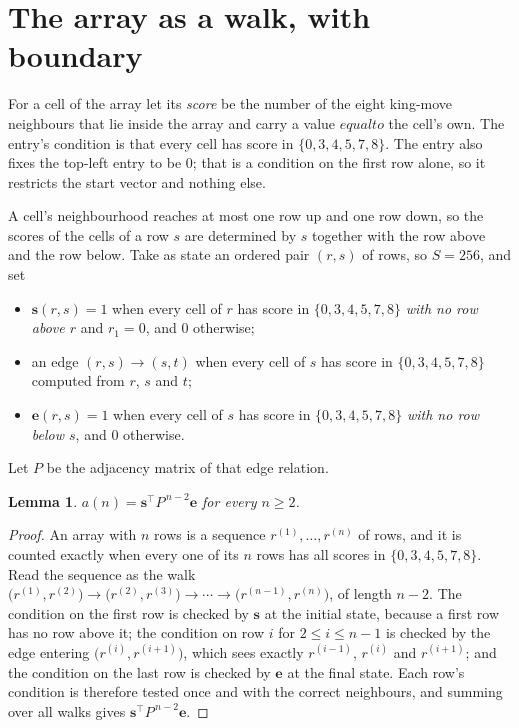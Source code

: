 \documentclass[11pt,a4paper]{article}
\theoremstyle{plain}
\newtheorem{lemma}[theorem]{Lemma}
\theoremstyle{definition}
\begin{document}
\section{The array as a walk, with boundary}

For a cell of the array let its \emph{score} be the number of the eight king-move neighbours that lie inside
the array and carry a value $equal to$ the cell's own. The entry's condition is that every cell
has score in $\{0,3,4,5,7,8\}$. The entry also fixes the top-left entry to be $0$; that is a condition on the first row alone, so it restricts the start vector and nothing else.

A cell's neighbourhood reaches at most one row up and one row down, so the scores of the
cells of a row $s$ are determined by $s$ together with the row above and the row below.
Take as state an ordered pair $(r,s)$ of rows, so $S=256$, and set
\begin{itemize}
\item $\mathbf{s}(r,s)=1$ when every cell of $r$ has score in $\{0,3,4,5,7,8\}$ \emph{with no row
above $r$} and $r_1=0$, and $0$ otherwise;
\item an edge $(r,s)\to(s,t)$ when every cell of $s$ has score in $\{0,3,4,5,7,8\}$ computed from
$r$, $s$ and $t$;
\item $\mathbf{e}(r,s)=1$ when every cell of $s$ has score in $\{0,3,4,5,7,8\}$ \emph{with no row
below $s$}, and $0$ otherwise.
\end{itemize}
Let $P$ be the adjacency matrix of that edge relation.

\begin{lemma}\label{lem:walk}
$a(n)=\mathbf{s}^{\!\top}P^{\,n-2}\mathbf{e}$ for every $n\ge2$.
\end{lemma}

\begin{proof}
An array with $n$ rows is a sequence $r^{(1)},\dots,r^{(n)}$ of rows, and it is counted
exactly when every one of its $n$ rows has all scores in $\{0,3,4,5,7,8\}$. Read the sequence as the
walk $\bigl(r^{(1)},r^{(2)}\bigr)\to\bigl(r^{(2)},r^{(3)}\bigr)\to\cdots\to
\bigl(r^{(n-1)},r^{(n)}\bigr)$, of length $n-2$. The condition on the first row is
checked by $\mathbf{s}$ at the initial state, because a first row has no row above it; the
condition on row $i$ for $2\le i\le n-1$ is checked by the edge entering
$\bigl(r^{(i)},r^{(i+1)}\bigr)$, which sees exactly $r^{(i-1)}$, $r^{(i)}$ and
$r^{(i+1)}$; and the condition on the last row is checked by $\mathbf{e}$ at the final
state. Each row's condition is therefore tested once and with the correct neighbours, and
summing over all walks gives $\mathbf{s}^{\!\top}P^{\,n-2}\mathbf{e}$.
\end{proof}
\end{document}
